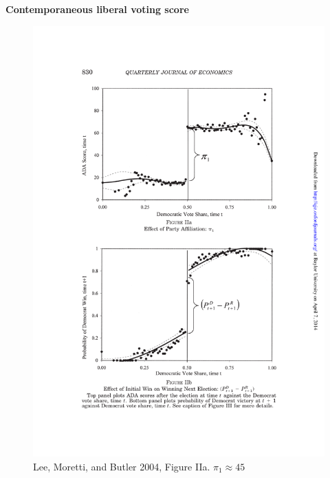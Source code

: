 \documentclass[notes=show]{beamer}
\begin{document}
\clearpage
\newpage

\begin{frame}[plain]
	\begin{center}
	\textbf{Contemporaneous liberal voting score}
	\end{center}
	
	\begin{figure}
	\includegraphics[scale=0.75]{./lecture_includes/lee_fig2.pdf}
	\caption{Lee, Moretti, and Butler 2004, Figure IIa. $\pi_1\approx 45$}
	\end{figure}
\end{frame}
\end{document}
